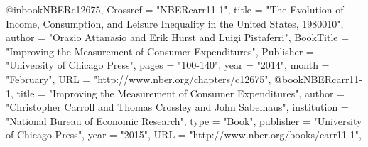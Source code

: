 @inbook{NBERc12675,
 Crossref = "NBERcarr11-1",
 title = "The Evolution of Income, Consumption, and Leisure Inequality in the United States, 1980ֲ010",
 author = "Orazio Attanasio and Erik Hurst and Luigi Pistaferri",
 BookTitle = "Improving the Measurement of Consumer Expenditures",
 Publisher = "University of Chicago Press",
 pages = "100-140",
 year = "2014",
 month = "February",
 URL = "http://www.nber.org/chapters/c12675",
}
@book{NBERcarr11-1,
 title = "Improving the Measurement of Consumer Expenditures",
 author = "Christopher Carroll and Thomas Crossley and John Sabelhaus",
 institution = "National Bureau of Economic Research",
 type = "Book",
 publisher = "University of Chicago Press",
 year = "2015",
 URL = "http://www.nber.org/books/carr11-1",
}
